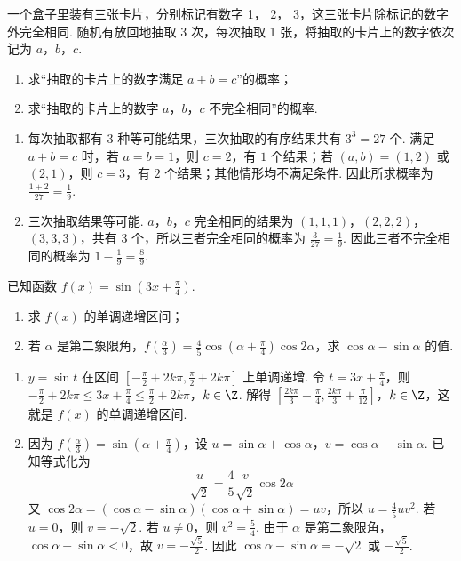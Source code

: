 \begin{problem}
一个盒子里装有三张卡片，分别标记有数字 1， 2， 3，这三张卡片除标记的数字外完全相同. 随机有放回地抽取 3 次，每次抽取 1 张，将抽取的卡片上的数字依次记为 \(a\)，\(b\)，\(c\).

\begin{enumerate}
\item 求“抽取的卡片上的数字满足 \(a + b = c\)”的概率；
\item 求“抽取的卡片上的数字 \(a\)，\(b\)，\(c\) 不完全相同”的概率.
\end{enumerate}

\begin{solution}
\begin{enumerate}
\item 每次抽取都有 \(3\) 种等可能结果，三次抽取的有序结果共有 \(3^3=27\) 个. 满足 \(a+b=c\) 时，若 \(a=b=1\)，则 \(c=2\)，有 \(1\) 个结果；若 \((a,b)=(1,2)\) 或 \((2,1)\)，则 \(c=3\)，有 \(2\) 个结果；其他情形均不满足条件. 因此所求概率为 \(\frac{1+2}{27}=\frac19\).
\item 三次抽取结果等可能. \(a\)，\(b\)，\(c\) 完全相同的结果为 \((1,1,1)\)，\((2,2,2)\)，\((3,3,3)\)，共有 \(3\) 个，所以三者完全相同的概率为 \(\frac3{27}=\frac19\). 因此三者不完全相同的概率为 \(1-\frac19=\frac89\).
\end{enumerate}
\end{solution}
\end{problem}

\begin{problem}
已知函数 \(f(x) = \sin \left(3x + \frac{\pi}{4}\right)\).

\begin{enumerate}
\item 求 \(f(x)\) 的单调递增区间；
\item 若 \(\alpha\) 是第二象限角，\(f\left(\frac{\alpha}{3}\right) = \frac{4}{5}\cos \left(\alpha + \frac{\pi}{4}\right)\cos 2\alpha\)，求 \(\cos \alpha - \sin \alpha\) 的值.
\end{enumerate}

\begin{solution}
\begin{enumerate}
\item \(y=\sin t\) 在区间 \(\left[-\frac\pi2+2k\pi,\frac\pi2+2k\pi\right]\) 上单调递增. 令 \(t=3x+\frac\pi4\)，则
\(-\frac\pi2+2k\pi\leqslant3x+\frac\pi4\leqslant\frac\pi2+2k\pi\)，\(k\in\Z\).
解得 \(\left[\frac{2k\pi}{3}-\frac\pi4,\frac{2k\pi}{3}+\frac\pi{12}\right]\)，\(k\in\Z\)，这就是 \(f(x)\) 的单调递增区间.
\item 因为 \(f\left(\frac\alpha3\right)=\sin\left(\alpha+\frac\pi4\right)\)，设 \(u=\sin\alpha+\cos\alpha\)，\(v=\cos\alpha-\sin\alpha\). 已知等式化为
\[
\frac{u}{\sqrt2}=\frac45\frac{v}{\sqrt2}\cos2\alpha
\]
又 \(\cos2\alpha=(\cos\alpha-\sin\alpha)(\cos\alpha+\sin\alpha)=uv\)，所以 \(u=\frac45uv^2\). 若 \(u=0\)，则 \(v=-\sqrt2\). 若 \(u\neq0\)，则 \(v^2=\frac54\). 由于 \(\alpha\) 是第二象限角，\(\cos\alpha-\sin\alpha<0\)，故 \(v=-\frac{\sqrt5}{2}\). 因此 \(\cos\alpha-\sin\alpha=-\sqrt2\) 或 \(-\frac{\sqrt5}{2}\).
\end{enumerate}
\end{solution}
\end{problem}


